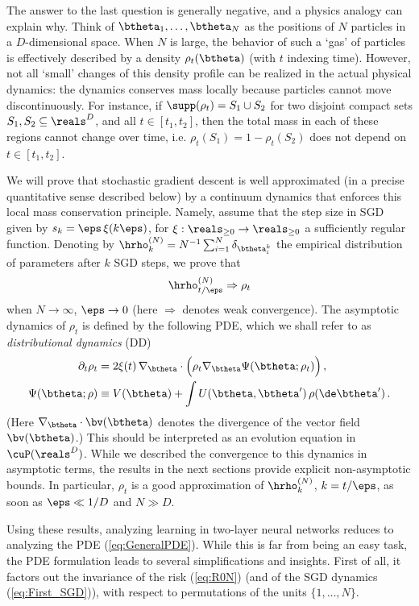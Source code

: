 \documentclass[11pt]{article}
\renewcommand{\eqref}[1]{(\ref{#1})}
\begin{document}
The answer to the last question is generally negative, and a physics analogy can explain why.
Think of $\btheta_1,\dots,\btheta_N$ as the positions of $N$ particles in a $D$-dimensional space. 
When $N$ is large, the behavior of such a `gas' of particles is effectively described by a density $\rho_t(\btheta)$ (with $t$ indexing time). However, not all `small' 
changes of this density profile can be realized in the actual physical dynamics:
the dynamics conserves mass locally because particles cannot move discontinuously.
For instance, if $\supp(\rho_t) = S_1\cup S_2$ for two disjoint compact sets $S_1,S_2\subseteq\reals^D$, and all $t\in [t_1,t_2]$,
then the total mass in each of these regions cannot change over time, i.e. $\rho_t(S_1) = 1-\rho_t(S_2)$ does not depend on $t\in [t_1,t_2]$. 

We will prove that stochastic gradient descent is well approximated (in a precise quantitative sense described below) 
 by a continuum dynamics that enforces this local mass conservation principle. 
Namely, assume that the step size in SGD  given by $s_k= \eps\, \xi(k\eps)$, for $\xi:\reals_{\ge 0}\to\reals_{\ge 0}$ a sufficiently 
regular function. Denoting by $\hrho_k^{(N)}=N^{-1}\sum_{i=1}^N \delta_{\btheta^k_i}$ the empirical distribution of parameters
after $k$ SGD steps, we prove that
%
\begin{align}
\hrho^{(N)}_{t/\eps}\Rightarrow \rho_t
\end{align}
%
 when $N\to\infty$, $\eps\to 0$ (here $\Rightarrow$ denotes weak convergence).
The asymptotic dynamics of  $\rho_t$ is defined by the following PDE, which we shall refer to as \emph{distributional dynamics} (DD)
%
\begin{align}
%
\partial_t \rho_t & =2\xi(t)\, \nabla_{\btheta}\cdot \Big(\rho_t \nabla_{\btheta}\Psi(\btheta;\rho_t)\Big)\, ,\label{eq:GeneralPDE}\\
\Psi(\btheta;\rho) & \equiv V(\btheta)+\int U(\btheta,\btheta')\, \rho(\de\btheta')\, .
%
\end{align}
%
(Here $\nabla_{\btheta}\cdot \bv(\btheta)$ denotes the divergence of the vector field $\bv(\btheta)$.)
This should  be interpreted as an evolution equation in $\cuP(\reals^D)$.
While we described the convergence to this dynamics in asymptotic terms, the results  in the next sections
provide explicit non-asymptotic bounds. In particular, $\rho_t$ is a good approximation of $\hrho_k^{(N)}$,
$k=t/\eps$, as soon as $\eps\ll 1/D$ and $N\gg D$.

Using these results, analyzing learning in two-layer neural networks reduces to analyzing the PDE \eqref{eq:GeneralPDE}.
While this is far from being an easy task,  the  PDE formulation leads to several simplifications and insights.
First of all, it factors out the invariance of the risk \eqref{eq:R0N}  (and of the SGD dynamics \eqref{eq:First_SGD}),
with respect to permutations of the units $\{1,\dots,N\}$. 
\end{document}

